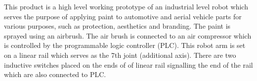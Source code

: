 This product is a high level working prototype of an industrial level robot which serves the purpose of applying paint to automotive and aerial vehicle parts for various purposes, such as protection, aesthetics and branding. The paint is sprayed using an airbrush. The air brush is connected to an air compressor which is controlled by the programmable logic controller (PLC). This robot arm is set on a linear rail which serves as the 7th joint (additional axis). There are two inductive switches placed on the ends of of linear rail signalling the end of the rail which are also connected to PLC.
